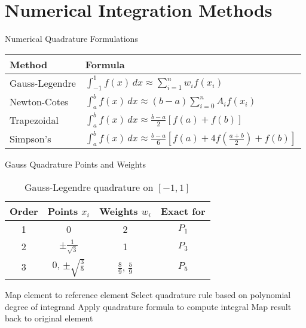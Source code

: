 \documentclass{beamer}
\begin{document}
\section{Numerical Integration Methods}

\begin{frame}{Numerical Quadrature Formulations}
\begin{table}
\begin{tabular}{|l|p{6cm}|}
\hline
\textbf{Method} & \textbf{Formula} \\
\hline
Gauss-Legendre & $\int_{-1}^1 f(x) \, dx \approx \sum_{i=1}^n w_i f(x_i)$ \\
\hline
Newton-Cotes & $\int_a^b f(x) \, dx \approx (b-a) \sum_{i=0}^n A_i f(x_i)$ \\
\hline
Trapezoidal & $\int_a^b f(x) \, dx \approx \frac{b-a}{2}[f(a) + f(b)]$ \\
\hline
Simpson's & $\int_a^b f(x) \, dx \approx \frac{b-a}{6}[f(a) + 4f(\frac{a+b}{2}) + f(b)]$ \\
\hline
\end{tabular}
\end{table}
\end{frame}
\begin{frame}{Gauss Quadrature Points and Weights}
\begin{table}
\centering
\begin{tabular}{|c|c|c|c|}
\hline
\textbf{Order} & \textbf{Points} $x_i$ & \textbf{Weights} $w_i$ & \textbf{Exact for} \\
\hline
1 & 0 & 2 & $P_1$ \\
\hline
2 & $\pm\frac{1}{\sqrt{3}}$ & 1 & $P_3$ \\
\hline
3 & 0, $\pm\sqrt{\frac{3}{5}}$ & $\frac{8}{9}$, $\frac{5}{9}$ & $P_5$ \\
\hline
\end{tabular}
\caption{Gauss-Legendre quadrature on $[-1,1]$}
\end{table}

\begin{algorithm}[H]
\caption{Numerical Integration for FEM}
\begin{algorithmic}[1]
\State Map element to reference element
\State Select quadrature rule based on polynomial degree of integrand
\State Apply quadrature formula to compute integral
\State Map result back to original element
\end{algorithmic}
\end{algorithm}
\end{frame}
\end{document}

